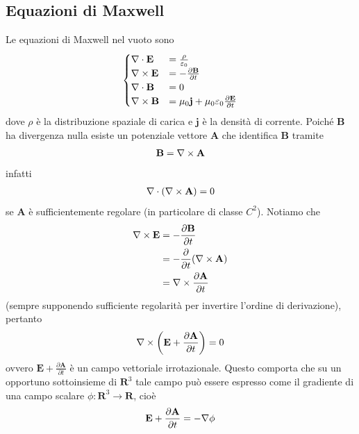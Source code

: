 \documentclass{article}
\begin{document}
\subsection*{Equazioni di Maxwell}
Le equazioni di Maxwell nel vuoto sono 
\begin{align}
    \begin{cases}
        \nabla \cdot \mathbf{E} &= \frac{\rho}{\varepsilon_0} \\
        \nabla \times \mathbf{E} &= -\frac{\partial \mathbf{B}}{\partial t} \\
        \nabla \cdot \mathbf{B} &= 0 \\
        \nabla \times \mathbf{B} &= \mu_0\mathbf{j} + \mu_0\varepsilon_0\frac{\partial \mathbf{E}}{\partial t} \\
    \end{cases} \notag
\end{align}
dove $\rho$ è la distribuzione spaziale di carica e $\mathbf{j}$ è la densità di corrente. Poiché $\mathbf{B}$ ha divergenza nulla esiste un potenziale vettore $\mathbf{A}$ che identifica $\mathbf{B}$ tramite
\begin{align}
    \mathbf{B} = \nabla \times \mathbf{A} \notag
\end{align}
infatti 
\begin{align}
    \nabla \cdot (\nabla \times \mathbf{A}) = 0 \notag
\end{align}
se $\mathbf{A}$ è sufficientemente regolare (in particolare di classe $C^2$). Notiamo che 
\begin{align}
    \nabla \times \mathbf{E} &= -\frac{\partial \mathbf{B}}{\partial t} \notag \\
    &= -\frac{\partial}{\partial t}(\nabla \times \mathbf{A}) \notag \\
    &= \nabla \times \frac{\partial \mathbf{A}}{\partial t} \notag
\end{align}
(sempre supponendo sufficiente regolarità per invertire l'ordine di derivazione), pertanto 
\begin{align}
    \nabla \times \left(\mathbf{E} + \frac{\partial \mathbf{A}}{\partial t}\right) = 0 \notag
\end{align}
ovvero $\mathbf{E} + \frac{\partial \mathbf{A}}{\partial t}$ è un campo vettoriale irrotazionale. Questo comporta che su un opportuno sottoinsieme di $\mathbf{R}^3$ tale campo può essere espresso come il gradiente di una campo scalare $\phi : \mathbf{R}^3 \longrightarrow \mathbf{R}$, cioè 
\begin{align}
    \mathbf{E} + \frac{\partial \mathbf{A}}{\partial t} = -\nabla\phi \notag
\end{align}
\end{document}
